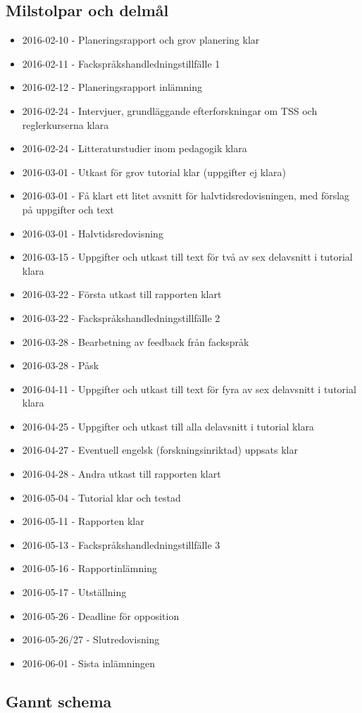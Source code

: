 \documentclass{article}
\begin{document}
\subsection{Milstolpar och delmål}
\begin{itemize}
\item 2016-02-10 - Planeringsrapport och grov planering klar
\item 2016-02-11 - Fackspråkshandledningstillfälle 1
\item 2016-02-12 - Planeringsrapport inlämning
\item 2016-02-24 - Intervjuer, grundläggande efterforskningar om TSS och reglerkurserna klara
\item 2016-02-24 - Litteraturstudier inom pedagogik klara
\item 2016-03-01 - Utkast för grov tutorial klar (uppgifter ej klara)
\item 2016-03-01 - Få klart ett litet avsnitt för halvtidsredovisningen, med förslag på uppgifter och text
\item 2016-03-01 - Halvtidsredovisning
\item 2016-03-15 - Uppgifter och utkast till text för två av sex delavsnitt i tutorial klara
\item 2016-03-22 - Första utkast till rapporten klart
\item 2016-03-22 - Fackspråkshandledningstillfälle 2
\item 2016-03-28 - Bearbetning av feedback från fackspråk
\item 2016-03-28 - Påsk
\item 2016-04-11 - Uppgifter och utkast till text för fyra av sex delavsnitt i tutorial klara
\item 2016-04-25 - Uppgifter och utkast till alla delavsnitt i tutorial klara
\item 2016-04-27 - Eventuell engelsk (forskningsinriktad) uppsats klar
\item 2016-04-28 - Andra utkast till rapporten klart
\item 2016-05-04 - Tutorial klar och testad
\item 2016-05-11 - Rapporten klar
\item 2016-05-13 - Fackspråkshandledningstillfälle 3
\item 2016-05-16 - Rapportinlämning
\item 2016-05-17 - Utställning
\item 2016-05-26 - Deadline för opposition
\item 2016-05-26/27 - Slutredovisning
\item 2016-06-01 - Sista inlämningen
\end{itemize}

\newpage
\subsection{Gannt schema}
\begin{figure}
    \centering
    
\end{figure}
\end{document}

